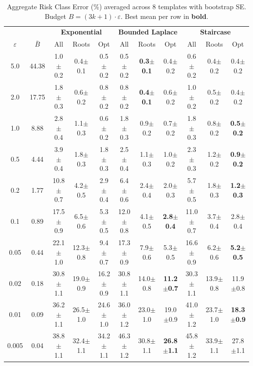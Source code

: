 \providecommand{\pmstd}[1]{{\scriptsize $\pm$#1}}

\begin{table}[t]
\centering
\setlength{\tabcolsep}{2.8pt}
\small
\caption{Aggregate Risk Class Error (\%) averaged across 8 templates with bootstrap SE. Budget $B = (3k+1) \cdot \varepsilon$. Best mean per row in \textbf{bold}.}
\label{tab:rq1_3kplus1_rce}
\begin{tabular}{cc|ccc|ccc|ccc}
\toprule
& & \multicolumn{3}{c|}{\textbf{Exponential}} & \multicolumn{3}{c|}{\textbf{Bounded Laplace}} & \multicolumn{3}{c}{\textbf{Staircase}} \\
$\varepsilon$ & $\bar{B}$ & All & Roots & Opt & All & Roots & Opt & All & Roots & Opt \\
\midrule
5.0 & 44.38 & 1.0\pmstd{0.2} & 0.4\pmstd{0.1} & 0.5\pmstd{0.2} & 0.5\pmstd{0.2} & \textbf{0.3\pmstd{0.1}} & 0.4\pmstd{0.2} & 0.6\pmstd{0.2} & 0.4\pmstd{0.2} & 0.4\pmstd{0.2} \\
2.0 & 17.75 & 1.8\pmstd{0.3} & 0.6\pmstd{0.2} & 0.8\pmstd{0.2} & 0.8\pmstd{0.2} & \textbf{0.4\pmstd{0.1}} & 0.6\pmstd{0.2} & 1.0\pmstd{0.2} & 0.5\pmstd{0.2} & 0.4\pmstd{0.2} \\
1.0 & 8.88 & 2.8\pmstd{0.4} & 1.1\pmstd{0.3} & 0.6\pmstd{0.2} & 1.8\pmstd{0.3} & 0.9\pmstd{0.2} & 0.7\pmstd{0.2} & 1.8\pmstd{0.3} & 0.8\pmstd{0.2} & \textbf{0.5\pmstd{0.2}} \\
0.5 & 4.44 & 3.9\pmstd{0.4} & 1.8\pmstd{0.3} & 1.8\pmstd{0.3} & 2.5\pmstd{0.4} & 1.1\pmstd{0.3} & 1.0\pmstd{0.2} & 2.3\pmstd{0.3} & 1.2\pmstd{0.2} & \textbf{0.9\pmstd{0.2}} \\
0.2 & 1.77 & 10.8\pmstd{0.7} & 4.2\pmstd{0.5} & 2.9\pmstd{0.4} & 6.4\pmstd{0.6} & 2.4\pmstd{0.4} & 2.0\pmstd{0.3} & 5.7\pmstd{0.5} & 1.8\pmstd{0.3} & \textbf{1.2\pmstd{0.3}} \\
0.1 & 0.89 & 17.5\pmstd{0.9} & 6.5\pmstd{0.6} & 5.3\pmstd{0.5} & 12.0\pmstd{0.8} & 4.1\pmstd{0.5} & \textbf{2.8\pmstd{0.4}} & 11.0\pmstd{0.7} & 3.7\pmstd{0.4} & 2.8\pmstd{0.4} \\
0.05 & 0.44 & 22.1\pmstd{1.0} & 12.3\pmstd{0.8} & 9.4\pmstd{0.7} & 17.3\pmstd{0.9} & 7.9\pmstd{0.6} & 5.3\pmstd{0.5} & 16.6\pmstd{0.9} & 6.2\pmstd{0.6} & \textbf{5.2\pmstd{0.5}} \\
0.02 & 0.18 & 30.8\pmstd{1.1} & 19.0\pmstd{0.9} & 16.2\pmstd{0.9} & 30.8\pmstd{1.1} & 14.0\pmstd{0.8} & \textbf{11.2\pmstd{0.7}} & 30.3\pmstd{1.1} & 13.9\pmstd{0.8} & 11.9\pmstd{0.8} \\
0.01 & 0.09 & 36.2\pmstd{1.1} & 26.5\pmstd{1.0} & 24.6\pmstd{1.0} & 36.0\pmstd{1.2} & 23.0\pmstd{1.0} & 19.0\pmstd{0.9} & 41.0\pmstd{1.2} & 23.7\pmstd{1.0} & \textbf{18.3\pmstd{0.9}} \\
0.005 & 0.04 & 38.8\pmstd{1.1} & 32.4\pmstd{1.1} & 34.2\pmstd{1.1} & 46.3\pmstd{1.2} & 30.8\pmstd{1.1} & \textbf{26.8\pmstd{1.1}} & 45.8\pmstd{1.2} & 33.9\pmstd{1.1} & 27.8\pmstd{1.1} \\
\bottomrule
\end{tabular}
\end{table}
